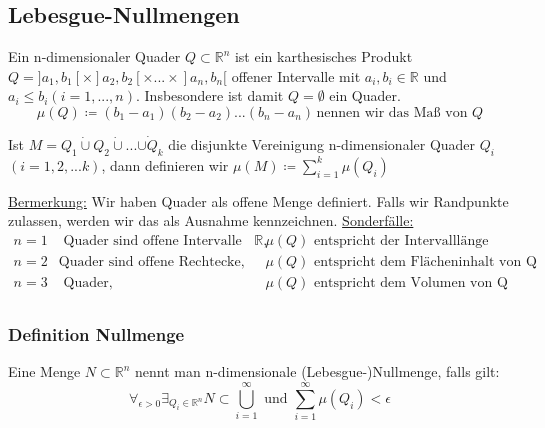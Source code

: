 \subsection{Lebesgue-Nullmengen}
Ein n-dimensionaler Quader $Q \subset \mathbb{R}^n$ ist ein karthesisches Produkt $Q = ]a_1,b_1[ \times ]a_2,b_2[ \times ... \times ]a_n,b_n[$ offener Intervalle mit $a_i,b_i \in \mathbb{R}$ und $a_i \leq b_i (i=1,...,n)$. Insbesondere ist damit $Q = \emptyset$ ein Quader.
\[ \mu(Q)\coloneqq (b_1 - a_1)(b_2 - a_2)...(b_n - a_n)\, \text{nennen wir das Maß von $Q$}\]

Ist $M = Q_1 \dot\cup Q_2 \dot{\cup} ... \dot{\cup Q_k}$ die disjunkte Vereinigung n-dimensionaler Quader $Q_i$ $(i=1,2,...k)$, dann definieren wir $\mu(M)\coloneqq \sum_{i=1}^{k} \mu(Q_i)$

\underline{Bermerkung:}
Wir haben Quader als offene Menge definiert. Falls wir Randpunkte zulassen, werden wir das als Ausnahme kennzeichnen.
\underline{Sonderfälle:}
\begin{equation*}
	\begin{matrix}
		n=1 &\text{ Quader sind offene Intervalle des } \mathbb{R}, & \mu(Q) \text{ entspricht der Intervalllänge}\\
		n=2 & \text{Quader sind offene Rechtecke, } & \mu(Q) \text{ entspricht dem Flächeninhalt von Q}\\
		n=3 &\text{ Quader, } & \mu(Q) \text{ entspricht dem Volumen von Q}\\
	\end{matrix}
\end{equation*}
\subsubsection{Definition Nullmenge}
Eine Menge $N \subset \mathbb{R}^n$ nennt man n-dimensionale (Lebesgue-)Nullmenge, falls gilt:
\[\forall_{\epsilon > 0} \exists_{Q_i \in \mathbb{R}^n} N \subset \bigcup_{i =1}^{\infty} \text{ und } \sum_{i=1}^{\infty} \mu(Q_i) < \epsilon\]


